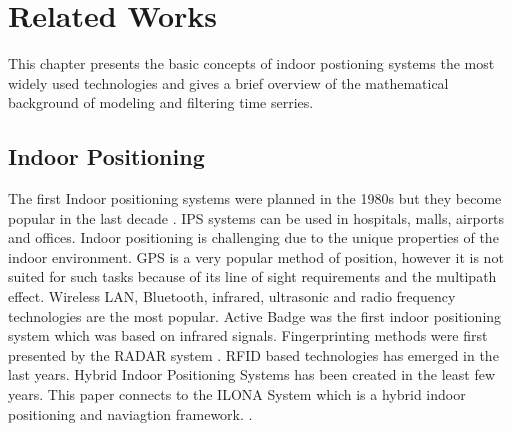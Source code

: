 \chapter{Related Works}
\label{chap:relatedWorks}
This chapter presents the basic concepts  of indoor postioning systems the most widely used technologies and gives a brief overview of the mathematical background of modeling and filtering  time serries.
\section{Indoor Positioning}
The first Indoor positioning systems were planned in the 1980s but they become popular in the last decade \cite{liu2007survey,gu2009survey}. 
IPS systems can be used in hospitals, malls, airports and offices.
Indoor positioning is challenging due to the unique properties of the indoor environment.
GPS is a very popular method of position, however it is not suited for such tasks because of its line of sight requirements and the multipath effect.
Wireless LAN, Bluetooth, infrared, ultrasonic and radio frequency  technologies are the most popular.
Active Badge \cite{want1992active} was the first indoor positioning system which was based on infrared signals.
Fingerprinting methods were first presented by the RADAR system \cite{bahl2000radar}.
RFID \cite{ni2004landmarc} based technologies has emerged in the last years.
Hybrid Indoor Positioning Systems \cite{baniukevic2013hybrid} has been created in the least few years.
This paper connects to the ILONA System which is a hybrid indoor positioning and naviagtion framework. \cite{ZsoltToth2015}.


